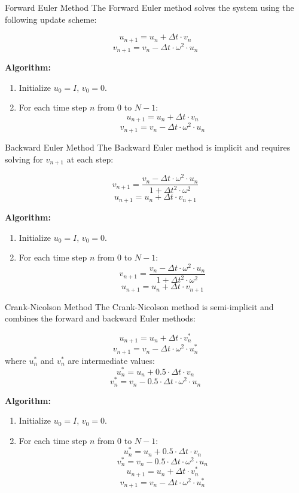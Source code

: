 \documentclass[10pt, aspectratio=54]{beamer}
\begin{document}
\begin{frame}{Forward Euler Method}
	\justifying
	The Forward Euler method solves the system using the following update scheme:
	
	\[
	u_{n+1} = u_n + \Delta t \cdot v_n
	\]
	\[
	v_{n+1} = v_n - \Delta t \cdot \omega^2 \cdot u_n
	\]
	
	\textbf{Algorithm:}
	\begin{enumerate}
		\item Initialize \( u_0 = I \), \( v_0 = 0 \).
		\item For each time step \( n \) from 0 to \( N-1 \):
		\[
		u_{n+1} = u_n + \Delta t \cdot v_n
		\]
		\[
		v_{n+1} = v_n - \Delta t \cdot \omega^2 \cdot u_n
		\]
	\end{enumerate}
\end{frame}

\begin{frame}{Backward Euler Method}
	\justifying
	The Backward Euler method is implicit and requires solving for \( v_{n+1} \) at each step:
	
	\[
	v_{n+1} = \frac{v_n - \Delta t \cdot \omega^2 \cdot u_n}{1 + \Delta t^2 \cdot \omega^2}
	\]
	\[
	u_{n+1} = u_n + \Delta t \cdot v_{n+1}
	\]
	
	\textbf{Algorithm:}
	\begin{enumerate}
		\item Initialize \( u_0 = I \), \( v_0 = 0 \).
		\item For each time step \( n \) from 0 to \( N-1 \):
		\[
		v_{n+1} = \frac{v_n - \Delta t \cdot \omega^2 \cdot u_n}{1 + \Delta t^2 \cdot \omega^2}
		\]
		\[
		u_{n+1} = u_n + \Delta t \cdot v_{n+1}
		\]
	\end{enumerate}
\end{frame}


\begin{frame}{Crank-Nicolson Method}
	\justifying
	The Crank-Nicolson method is semi-implicit and combines the forward and backward Euler methods:
	
	\[
	u_{n+1} = u_n + \Delta t \cdot v^*_n
	\]
	\[
	v_{n+1} = v_n - \Delta t \cdot \omega^2 \cdot u^*_n
	\]
	where \( u^*_n \) and \( v^*_n \) are intermediate values:
	\[
	u^*_n = u_n + 0.5 \cdot \Delta t \cdot v_n
	\]
	\[
	v^*_n = v_n - 0.5 \cdot \Delta t \cdot \omega^2 \cdot u_n
	\]
	
	\textbf{Algorithm:}
	\begin{enumerate}
		\item Initialize \( u_0 = I \), \( v_0 = 0 \).
		\item For each time step \( n \) from 0 to \( N-1 \):
		\[
		u^*_n = u_n + 0.5 \cdot \Delta t \cdot v_n
		\]
		\[
		v^*_n = v_n - 0.5 \cdot \Delta t \cdot \omega^2 \cdot u_n
		\]
		\[
		u_{n+1} = u_n + \Delta t \cdot v^*_n
		\]
		\[
		v_{n+1} = v_n - \Delta t \cdot \omega^2 \cdot u^*_n
		\]
	\end{enumerate}
\end{frame}
\end{document}
